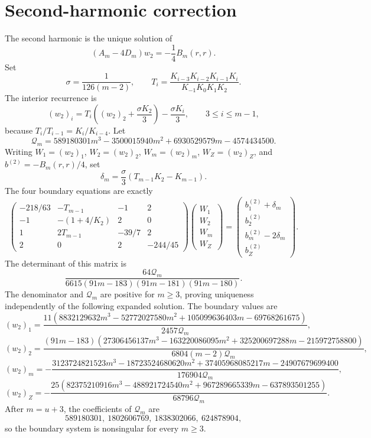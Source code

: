 \section*{Second-harmonic correction}
The second harmonic is the unique solution of
\[
(A_m-4D_m)w_2=-\frac14B_m(r,r).
\]
Set
\[
\sigma=\frac1{126(m-2)},
\qquad
T_i=\frac{K_{i-3}K_{i-2}K_{i-1}K_i}{K_{-1}K_0K_1K_2}.
\]
The interior recurrence is
\[
(w_2)_i=T_i\left((w_2)_2+\frac{\sigma K_2}{3}\right)
-\frac{\sigma K_i}{3},
\qquad 3\le i\le m-1,
\]
because $T_i/T_{i-1}=K_i/K_{i-4}$.  Let
\[
\mathcal Q_m=589180301m^3-3500015940m^2+6930529579m-4574434500.
\]
Writing $W_1=(w_2)_1$, $W_2=(w_2)_2$, $W_m=(w_2)_m$,
$W_Z=(w_2)_Z$, and $b^{(2)}=-B_m(r,r)/4$, set
\[
 \delta_m=\frac{\sigma}{3}(T_{m-1}K_2-K_{m-1}).
\]
The four boundary equations are exactly
\[
\begin{pmatrix}
-218/63&-T_{m-1}&-1&2\\
-1&-(1+4/K_2)&2&0\\
1&2T_{m-1}&-39/7&2\\
2&0&2&-244/45
\end{pmatrix}
\begin{pmatrix}W_1\\W_2\\W_m\\W_Z\end{pmatrix}
=
\begin{pmatrix}
b^{(2)}_1+\delta_m\\b^{(2)}_2\\
b^{(2)}_m-2\delta_m\\b^{(2)}_Z
\end{pmatrix}.
\]
The determinant of this matrix is
\[
 \frac{64\mathcal Q_m}
 {6615(91m-183)(91m-181)(91m-180)}.
\]
The denominator and $\mathcal Q_m$ are positive for $m\ge3$, proving
uniqueness independently of the following expanded solution.  The boundary
values are
\[
(w_2)_1=\frac{11(8832129632m^3-52772027580m^2+105099636403m-69768261675)}{2457\mathcal Q_m},
\]
\[
(w_2)_2=\frac{(91m-183)(27306456137m^3-163220086095m^2+325200697288m-215972758800)}{6804(m-2)\mathcal Q_m},
\]
\[
(w_2)_m=-\frac{3123724821523m^3-18723524680620m^2+37405968085217m-24907679699400}{176904\mathcal Q_m},
\]
\[
(w_2)_Z=-\frac{25(82375210916m^3-488921724540m^2+967289665339m-637893501255)}{68796\mathcal Q_m}.
\]
After $m=u+3$, the coefficients of $\mathcal Q_m$ are
\[
589180301,\ 1802606769,\ 1838302066,\ 624878904,
\]
so the boundary system is nonsingular for every $m\ge3$.
